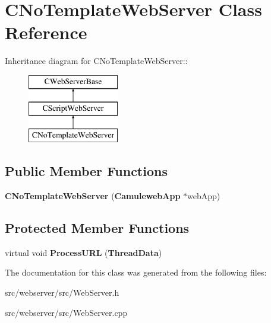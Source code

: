 \section{CNoTemplateWebServer Class Reference}
\label{classCNoTemplateWebServer}
Inheritance diagram for CNoTemplateWebServer::\begin{figure}[H]
\begin{center}
\leavevmode
\includegraphics[height=3cm]{classCNoTemplateWebServer}
\end{center}
\end{figure}
\subsection*{Public Member Functions}
\begin{DoxyCompactItemize}
\item 
{\bfseries CNoTemplateWebServer} ({\bf CamulewebApp} $\ast$webApp)\label{classCNoTemplateWebServer_a0f3d709131259665a3ec8bdf4e855897}

\end{DoxyCompactItemize}
\subsection*{Protected Member Functions}
\begin{DoxyCompactItemize}
\item 
virtual void {\bfseries ProcessURL} ({\bf ThreadData})\label{classCNoTemplateWebServer_a1dd8388185a18d60e49decf9008e05dd}

\end{DoxyCompactItemize}


The documentation for this class was generated from the following files:\begin{DoxyCompactItemize}
\item 
src/webserver/src/WebServer.h\item 
src/webserver/src/WebServer.cpp\end{DoxyCompactItemize}
